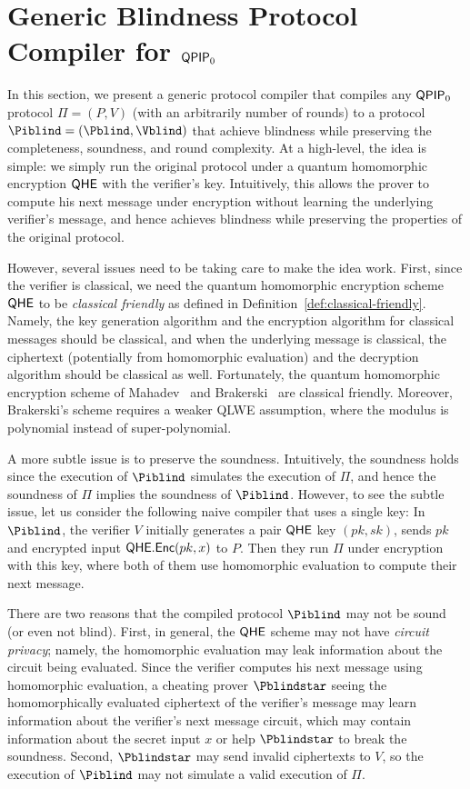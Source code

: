 \section{Generic Blindness Protocol Compiler for $\operatorname{\mathsf{QPIP}}_0$}
\label{sec:BlindBQP2}

In this section, we present a generic protocol compiler that compiles any $\operatorname{\mathsf{QPIP}}_0$ protocol $\Pi = (P, V)$ (with an arbitrarily number of rounds) to a protocol $\Piblind = (\Pblind, \Vblind)$ that achieve blindness while preserving the completeness, soundness, and round complexity. At a high-level, the idea is simple: we simply run the original protocol under a quantum homomorphic encryption $\mathsf{QHE}$ with the verifier's key. Intuitively, this allows the prover to compute his next message under encryption without learning the underlying verifier's message, and hence achieves blindness while preserving the properties of the original protocol.

However, several issues need to be taking care to make the idea work. First, since the verifier is classical, we need the quantum homomorphic encryption scheme $\mathsf{QHE}$ to be \emph{classical friendly} as defined in Definition~\ref{def:classical-friendly}. Namely, the key generation algorithm and the encryption algorithm for classical messages should be classical, and when the underlying message is classical, the ciphertext (potentially from homomorphic evaluation) and the decryption algorithm should be classical as well. Fortunately, the quantum homomorphic encryption scheme of Mahadev~\cite{mahadev_qfhe} and Brakerski~\cite{brakerski_qfhe} are classical friendly. Moreover, Brakerski's scheme requires a weaker QLWE assumption, where the modulus is polynomial instead of super-polynomial.

A more subtle issue is to preserve the soundness. Intuitively, the soundness holds since the execution of $\Piblind$ simulates the execution of $\Pi$, and hence the soundness of $\Pi$ implies the soundness of $\Piblind$. However, to see the subtle issue, let us consider the following naive compiler that uses a single key: In $\Piblind$,  the verifier $V$ initially generates a pair $\mathsf{QHE}$ key $(pk, sk)$, sends $pk$ and encrypted input $\mathsf{QHE.Enc}(pk,x)$ to $P$. Then they run $\Pi$ under encryption with this key, where both of them use homomorphic evaluation to compute their next message.

There are two reasons that the compiled protocol $\Piblind$ may not be sound (or even not blind). First, in general, the $\mathsf{QHE}$ scheme may not have \emph{circuit privacy}; namely, the homomorphic evaluation may leak information about the circuit being evaluated. Since the verifier computes his next message using homomorphic evaluation, a cheating prover $\Pblindstar$ seeing the homomorphically evaluated ciphertext of the verifier's message may learn information about the verifier's next message circuit, which may contain information about the secret input $x$ or help $\Pblindstar$ to break the soundness. Second, $\Pblindstar$ may send invalid ciphertexts to $V$, so the execution of $\Piblind$ may not simulate a valid execution of $\Pi$.

